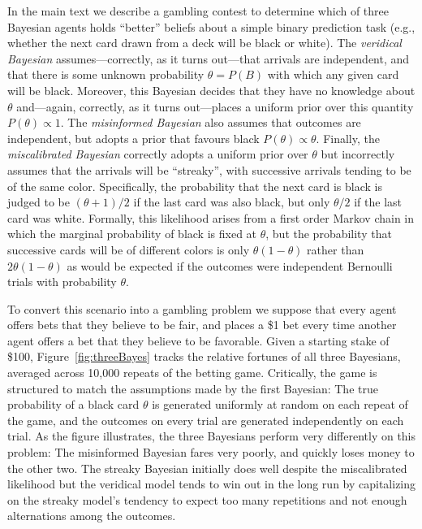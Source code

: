 \documentclass[doc,floatsintext]{apa6}
\begin{document}
In the main text we describe a gambling contest to determine which of three Bayesian agents holds ``better'' beliefs about a simple binary prediction task (e.g., whether the next card drawn from a deck will be black or white). The {\it veridical Bayesian} assumes---correctly, as it turns out---that arrivals are independent, and that there is some unknown probability $\theta = P(B)$ with which any given card will be black. Moreover, this Bayesian decides that they have no knowledge about $\theta$ and---again, correctly, as it turns out---places a uniform prior over this quantity $P(\theta) \propto 1$. The {\it misinformed Bayesian} also assumes that outcomes are independent, but adopts a prior that favours black  $P(\theta) \propto \theta$. Finally, the {\it miscalibrated Bayesian} correctly adopts a uniform prior over $\theta$ but incorrectly assumes that the arrivals will be ``streaky'', with successive arrivals tending to be of the same color. Specifically, the probability that the next card is black is judged to be $(\theta+1)/2$ if the last card was also black, but only $\theta/2$ if the last card was white. Formally, this likelihood arises from a first order Markov chain in which the marginal probability of black is fixed at $\theta$, but the probability that successive cards will be of different colors is only $\theta(1-\theta)$ rather than $2\theta(1-\theta)$ as would be expected if the outcomes were independent Bernoulli trials with probability $\theta$.

To convert this scenario into a gambling problem we suppose that every agent offers bets that they believe to be fair, and places a \$1 bet every time another agent offers a bet that they believe to be favorable. Given a starting stake of \$100, Figure~\ref{fig:threeBayes} tracks the relative fortunes of all three Bayesians, averaged across 10,000 repeats of the betting game. Critically, the game is structured to match the assumptions made by the first Bayesian: The true probability of a black card $\theta$ is generated uniformly at random on each repeat of the game, and the outcomes on every trial are generated independently on each trial. As the figure illustrates, the three Bayesians perform very differently on this problem: The misinformed Bayesian fares very poorly, and quickly loses money to the other two. The streaky Bayesian initially does well despite the miscalibrated likelihood but the veridical model tends to win out in the long run by capitalizing on the streaky model's tendency to expect too many repetitions and not enough alternations among the outcomes.
\end{document}
